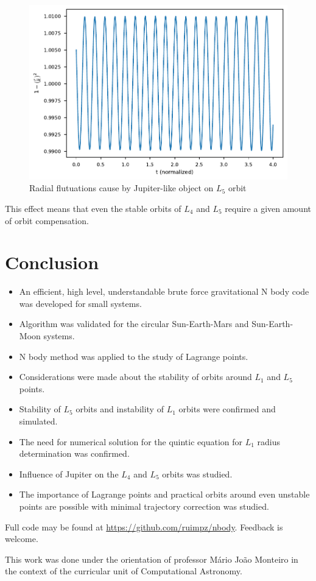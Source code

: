 \documentclass{aa}
\begin{document}
\begin{figure}[h!]
  \centering
  \includegraphics[width=\linewidth]{figs/l5_d_jup.pdf}
  \caption{Radial flutuations cause by Jupiter-like object on $L_5$ orbit}
  \label{fig:l5_jup}
\end{figure}

This effect means that even the stable orbits of $L_4$ and $L_5$ require a given
amount of orbit compensation.

\newpage

\section{Conclusion}

\begin{itemize}
\item An efficient, high level, understandable brute force gravitational N body
  code was developed for small systems.
\item Algorithm was validated for the circular Sun-Earth-Mars and Sun-Earth-Moon systems.
\item N body method was applied to the study of Lagrange points.
\item Considerations were made about the stability of orbits around $L_1$ and
  $L_5$ points.
\item Stability of $L_5$ orbits and instability of $L_1$ orbits were confirmed
  and simulated.
\item The need for numerical solution for the quintic equation for $L_1$ radius
  determination was confirmed.
\item Influence of Jupiter on the $L_4$ and $L_5$ orbits was studied.
\item The importance of Lagrange points and practical orbits around
  even unstable points are possible with minimal trajectory correction was studied.
\end{itemize}

Full code may be found at \url{https://github.com/ruimpz/nbody}. Feedback is welcome.

\begin{acknowledgements}
  This work was done under the orientation of professor Mário João Monteiro in the
  context of the curricular unit of Computational Astronomy.
\end{acknowledgements}



\end{document}
